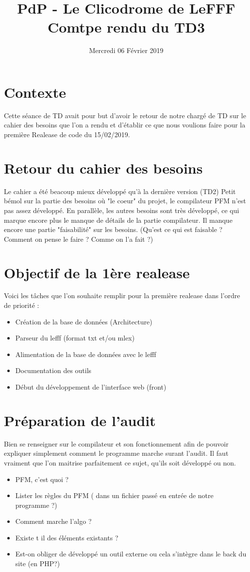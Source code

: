 \documentclass{article}
\title{PdP - Le Clicodrome de LeFFF \\ Comtpe rendu du TD3}
\author{}
\date{Mercredi 06 Février 2019}
\begin{document}
\maketitle

\section{Contexte}
Cette séance de TD avait pour but d'avoir le retour de notre chargé de TD sur le cahier des besoins que l'on a rendu et d'établir ce que nous voulions faire pour la première Realease de code du 15/02/2019.

\section{Retour du cahier des besoins}
\smallbreak Le cahier a été beacoup mieux développé qu'à la dernière version (TD2)
Petit bémol sur la partie des besoins où "le coeur" du projet, le compilateur PFM n'est pas assez développé.
En parallèle, les autres besoins sont très développé, ce qui marque encore plus le manque de détails de la partie compilateur.
Il manque encore une partie "faisabilité" sur les besoins. (Qu'est ce qui est faisable ? Comment on pense le faire ? Comme on l'a fait ?)


\section{Objectif de la 1ère realease}
Voici les tâches que l'on souhaite remplir pour la première realease dans l'ordre de priorité : 
\begin{itemize}
    \item Création de la base de données (Architecture)
    \item Parseur du lefff (format txt et/ou mlex)
    \item Alimentation de la base de données avec le lefff
    \item Documentation des outils
    \item Début du développement de l'interface web (front)
\end{itemize}

\section{Préparation de l'audit}
\smallbreak Bien se renseigner sur le compilateur et son fonctionnement afin de pouvoir expliquer simplement comment le programme marche surant l'audit.
Il faut vraiment que l'on maitrise parfaitement ce sujet, qu'ils soit développé ou non.
\begin{itemize}
    \item PFM, c'est quoi ?
    \item Lister les règles du PFM ( dans un fichier passé en entrée de notre programme ?)
    \item Comment marche l'algo ?
    \item Existe t il des éléments existants ?
    \item Est-on obliger de développé un outil externe ou cela s'intègre dans le back du site (en PHP?)
\end{itemize}
\end{document}
